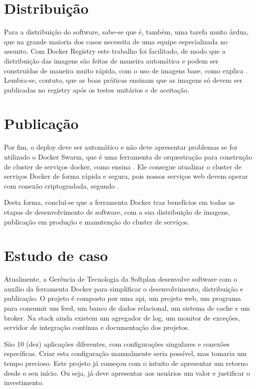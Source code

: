 \documentclass[
	12pt,				%
	openright,			%
	oneside,			%
	a4paper,			%
	chapter=TITLE,		%
	section=TITLE,		%
	english,			%
	french,				%
	spanish,			%
	brazil				%
	]{abntex2}
\begin{document}
\section{Distribuição}

Para a distribuição do software, sabe-se que é, também, uma tarefa muito árdua, que na grande maioria dos casos necessita de uma equipe especializada no assunto. Com Docker Registry este trabalho foi facilitado, de modo que a distribuição das imagens são feitas de maneira automática e podem ser construídas de maneira muito rápida, com o uso de imagens base, como explica . Lembra-se, contuto, que as boas práticas ensinam que as imagens só devem ser publicadas no registry após os testes unitários e de aceitação.

\section{Publicação}

Por fim, o deploy deve ser automático e não deve apresentar problemas se for utilizado o Docker Swarm, que é uma ferramenta de orquestração para construção de cluster de serviços docker, como ensina . Ele consegue atualizar o cluster de serviços Docker de forma rápida e segura, pois nossos serviços web devem operar com conexão criptogradada, segundo .

Desta forma, concluí-se que a ferramenta Docker traz benefícios em todas as etapas de desenvolvimento de software, com a sua distribuição de imagens, publicação em produção e manutenção do cluster de serviços.

\section{Estudo de caso}

Atualmente, a Gerência de Tecnologia da Softplan desenvolve software com o auxílio da ferramenta Docker para simplificar o desenvolvimento, distribuição e publicação. O projeto é composto por uma api, um projeto web, um programa para consumir um feed, um banco de dados relacional, um sistema de cache e um broker. Na stack ainda existem um agregador de log, um monitor de exceções, servidor de integração contínua e documentação dos projetos. 

São 10 (dez) aplicações diferentes, com configurações singulares e conexões específicas. Criar esta configuração manualmente seria possível, mas tomaria um tempo precioso. Este projeto já começou com o intuito de apresentar um retorno desde o seu início. Ou seja, já deve apresentar aos usuários um valor e justificar o investimento.
\end{document}
